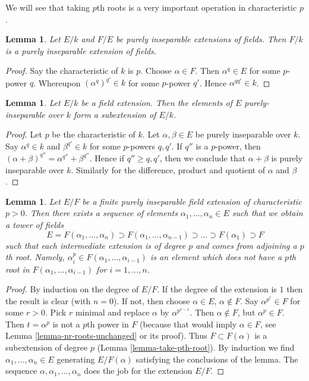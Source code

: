 \documentclass{stacks-project}
\theoremstyle{plain}
\newtheorem{lemma}[subsection]{Lemma}
\theoremstyle{definition}
\theoremstyle{remark}
\numberwithin{equation}{subsection}
\begin{document}
\noindent
We will see that taking $p$th roots is a very important operation in
characteristic $p$.

\begin{lemma}
\label{lemma-purely-inseparable-permanence}
Let $E/k$ and $F/E$ be purely inseparable extensions of fields. Then $F/k$
is a purely inseparable extension of fields.
\end{lemma}

\begin{proof}
Say the characteristic of $k$ is $p$. Choose $\alpha \in F$. Then
$\alpha^q \in E$ for some $p$-power $q$. Whereupon $(\alpha^q)^{q'} \in k$
for some $p$-power $q'$. Hence $\alpha^{qq'} \in k$.
\end{proof}

\begin{lemma}
\label{lemma-purely-inseparable-elements}
Let $E/k$ be a field extension. Then the elements of $E$ purely-inseparable
over $k$ form a subextension of $E/k$.
\end{lemma}

\begin{proof}
Let $p$ be the characteristic of $k$.
Let $\alpha, \beta \in E$ be purely inseparable over $k$. Say
$\alpha^q \in k$ and $\beta^{q'} \in k$ for some $p$-powers $q, q'$.
If $q''$ is a $p$-power, then
$(\alpha + \beta)^{q''} = \alpha^{q''} + \beta^{q''}$.
Hence if $q'' \geq q, q'$, then we conclude that $\alpha + \beta$
is purely inseparable over $k$. Similarly for the difference,
product and quotient of $\alpha$ and $\beta$.
\end{proof}

\begin{lemma}
\label{lemma-finite-purely-inseparable}
Let $E/F$ be a finite purely inseparable field extension of
characteristic $p > 0$. Then there exists a sequence of elements
$\alpha_1, \ldots, \alpha_n \in E$ such that we obtain a tower
of fields
$$
E = F(\alpha_1, \ldots, \alpha_n) \supset
F(\alpha_1, \ldots, \alpha_{n - 1}) \supset
\ldots
\supset F(\alpha_1) \supset F
$$
such that each intermediate extension is of degree $p$ and comes
from adjoining a $p$th root. Namely,
$\alpha_i^p \in F(\alpha_1, \ldots, \alpha_{i - 1})$
is an element which does not have a $p$th root in
$F(\alpha_1, \ldots, \alpha_{i - 1})$ for $i = 1, \ldots, n$.
\end{lemma}

\begin{proof}
By induction on the degree of $E/F$. If the degree of the extension is $1$
then the result is clear (with $n = 0$). If not, then choose
$\alpha \in E$, $\alpha \not \in F$. Say $\alpha^{p^r} \in F$ for some
$r > 0$. Pick $r$ minimal and replace $\alpha$ by $\alpha^{p^{r - 1}}$.
Then $\alpha \not \in F$, but $\alpha^p \in F$. Then $t = \alpha^p$ is not
a $p$th power in $F$ (because that would imply $\alpha \in F$, see
Lemma \ref{lemma-nr-roots-unchanged} or its proof).
Thus $F \subset F(\alpha)$ is a subextension of degree $p$
(Lemma \ref{lemma-take-pth-root}). By induction we find
$\alpha_1, \ldots, \alpha_n \in E$ generating $E/F(\alpha)$
satisfying the conclusions of the lemma.
The sequence $\alpha, \alpha_1, \ldots, \alpha_n$ does the job
for the extension $E/F$.
\end{proof}
\end{document}
